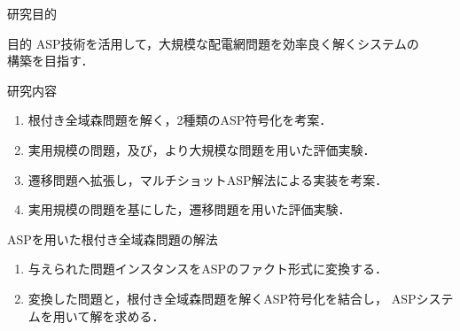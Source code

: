\documentclass[dvipdfmx,11pt]{beamer}
\begin{document}
\begin{frame}{研究目的}
 \begin{alertblock}{目的}
  ASP技術を活用して，大規模な配電網問題を効率良く解くシステムの\\ 構築を目指す．
 \end{alertblock}

 \begin{block}{研究内容}
  \begin{enumerate}
   \item 根付き全域森問題を解く，2種類のASP符号化を考案．
   \item 実用規模の問題，及び，より大規模な問題を用いた評価実験．
   \item 遷移問題へ拡張し，マルチショットASP解法による実装を考案．
   \item 実用規模の問題を基にした，遷移問題を用いた評価実験．
  \end{enumerate}
  
 \end{block}
 
\end{frame}

\begin{frame}{ASPを用いた根付き全域森問題の解法}
 
 \begin{figure}[htbp]
  \centering
  \scalebox{0.8}{}
 \end{figure}

 \begin{exampleblock}{}
  \begin{enumerate}
   \item 与えられた問題インスタンスをASPのファクト形式に変換する．
   \item 変換した問題と，根付き全域森問題を解くASP符号化を結合し，
		 ASPシステムを用いて解を求める．
  \end{enumerate}
 \end{exampleblock}
\end{frame}
\end{document}
